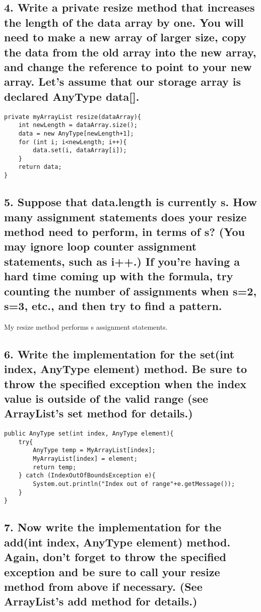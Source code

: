\documentclass[a4paper,11pt]{article}
\theoremstyle{mytheor}
\begin{document}
\subsection*{4. Write a private resize method that increases the length of the data array by one. You will need to make a new array of larger size, copy the data from the old array into the new array, and change the reference to point to your new array. Let's assume that our storage array is declared AnyType data[].}

\begin{lstlisting}
private myArrayList resize(dataArray){
    int newLength = dataArray.size();
    data = new AnyType[newLength+1];
    for (int i; i<newLength; i++){
        data.set(i, dataArray[i]);
    }
    return data;
}
\end{lstlisting}

\subsection*{5. Suppose that data.length is currently s. How many assignment statements does your resize method need to perform, in terms of s? (You may ignore loop counter assignment statements, such as i++.) If you're having a hard time coming up with the formula, try counting the number of assignments when s=2, s=3, etc., and then try to find a pattern.}
My resize method performs s assignment statements.

\subsection*{6. Write the implementation for the set(int index, AnyType element) method. Be sure to throw the specified exception when the index value is outside of the valid range (see ArrayList's set method for details.)}

\begin{lstlisting}
public AnyType set(int index, AnyType element){
    try{
        AnyType temp = MyArrayList[index];
        MyArrayList[index] = element;
        return temp;
    } catch (IndexOutOfBoundsException e){
        System.out.println("Index out of range"+e.getMessage());
    }
}
\end{lstlisting}

\subsection*{7. Now write the implementation for the add(int index, AnyType element) method. Again, don't forget to throw the specified exception and be sure to call your resize method from above if necessary. (See ArrayList's add method for details.)}
\end{document}
